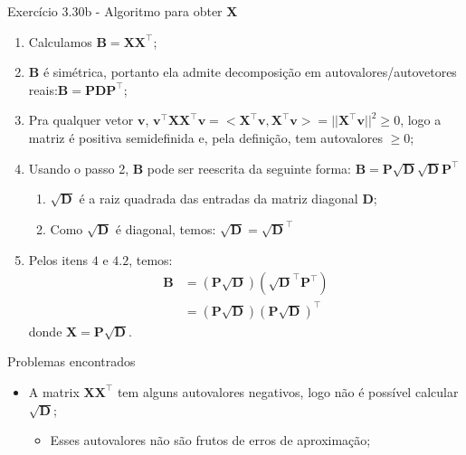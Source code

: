 \documentclass{beamer}
\begin{document}
\begin{frame}{Exerc\'icio 3.30b - Algoritmo para obter $ \textbf{X} $}
  \begin{enumerate}
  \item Calculamos $ \textbf{B} = \textbf{X} \textbf{X}^\top $;
  \item $ \textbf{B}$ \'e sim\'etrica, portanto ela admite decomposi\c{c}\~{a}o em autovalores/autovetores reais:$ \textbf{B} = \textbf{P} \textbf{D} \textbf{P}^\top $;
  \item Pra qualquer vetor $\textbf{v}$, $\textbf{v}^\top \textbf{X} \textbf{X}^\top \textbf{v} = <\textbf{X}^\top \textbf{v}, \textbf{X}^\top \textbf{v}> = || \textbf{X}^\top \textbf{v} ||^2 \geq 0$, logo a matriz \'e positiva semidefinida e, pela defini\c{c}\~{a}o, tem autovalores $\geq 0$;
  \item Usando o passo 2, $\textbf{B}$ pode ser reescrita da seguinte forma: $\textbf{B} = \textbf{P} \sqrt{\textbf{D}} \sqrt{\textbf{D}} \textbf{P}^\top$
    \begin{enumerate}
    \item $\sqrt{\textbf{D}}$ \'e a raiz quadrada das entradas da matriz diagonal $\textbf{D}$;
    \item Como $\sqrt{\textbf{D}}$ \'e diagonal, temos: $\sqrt{\textbf{D}} = \sqrt{\textbf{D}}^\top$
    \end{enumerate}
  \item Pelos itens $4$ e $4.2$, temos:
    \begin{align*}
      \textbf{B} &= (\textbf{P} \sqrt{\textbf{D}}) (\sqrt{\textbf{D}}^\top \textbf{P}^\top) \\
                 &= (\textbf{P} \sqrt{\textbf{D}}) (\textbf{P} \sqrt{\textbf{D}})^\top
    \end{align*}
    \noindent donde $ \textbf{X} = \textbf{P} \sqrt{\textbf{D}}$.
  \end{enumerate}
\end{frame}

\begin{frame}{Problemas encontrados}
  \begin{itemize}
  \item A matrix $ \textbf{X} \textbf{X}^\top $ tem alguns autovalores negativos, logo n\~{a}o \'e poss\'ivel calcular $ \sqrt{\textbf{D}} $;
    \begin{itemize}
    \item Esses autovalores n\~{a}o s\~{a}o frutos de erros de aproxima\c{c}\~{a}o;
    \end{itemize}
  \end{itemize}
\end{frame}
\end{document}
